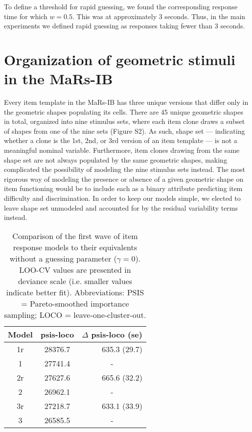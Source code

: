 \documentclass[a4paper,man,natbib]{apa6}
\begin{document}
To define a threshold for rapid guessing, we found the corresponding response time for which $w = 0.5$. This was at approximately 3 seconds. Thus, in the main experiments we defined rapid guessing as responses taking fewer than 3 seconds. 

\section{Organization of geometric stimuli in the MaRs-IB}

Every item template in the MaRs-IB has three unique versions that differ only in the geometric shapes populating its cells. There are 45 unique geometric shapes in total, organized into nine stimulus sets, where each item clone draws a subset of shapes from one of the nine sets (Figure S2). As such, shape set --- indicating whether a clone is the 1st, 2nd, or 3rd version of an item template --- is not a meaningful nominal variable. Furthermore, item clones drawing from the same shape set are not always populated by the same geometric shapes, making complicated the possibility of modeling the nine stimulus sets instead. The most rigorous way of modeling the presence or absence of a given geometric shape on item functioning would be to include each as a binary attribute predicting item difficulty and discrimination. In order to keep our models simple, we elected to leave shape set unmodeled and accounted for by the residual variability terms instead. 




\begin{table}
    \centering
    \begin{tabular*}{0.45\textwidth}{ccr}
    \toprule
    Model & psis-loco & $\Delta$ psis-loco (se) \\
    \midrule
    1r & 28376.7 & 635.3 (29.7) \\
    1 & 27741.4 & \multicolumn{1}{c}{-} \\
    \midrule
    2r & 27627.6 & 665.6 (32.2) \\
    2 & 26962.1 & \multicolumn{1}{c}{-} \\
    \midrule
    3r & 27218.7 & 633.1 (33.9) \\
    3 & 26585.5 & \multicolumn{1}{c}{-} \\
    \bottomrule
    \end{tabular*}
    \caption{\label{tab:2}\normalfont Comparison of the first wave of item response models to their equivalents without a guessing parameter ($\gamma = 0$). LOO-CV values are presented in deviance scale (i.e. smaller values indicate better fit). Abbreviations: PSIS = Pareto-smoothed importance sampling; LOCO = leave-one-cluster-out.}
    \label{table:2}
\end{table}
\end{document}
